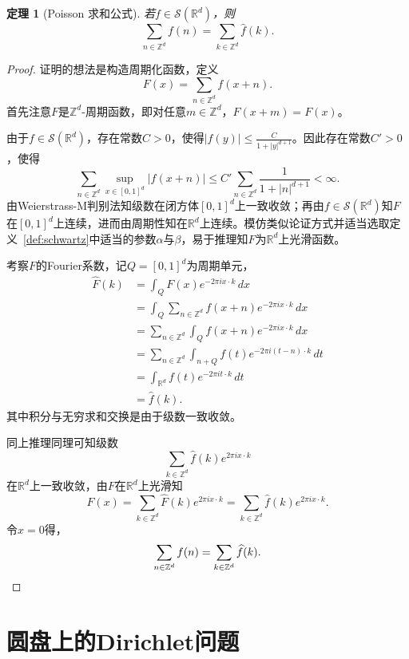 \documentclass[UTF8,zihao=5,linespread=1.34]{ctexart}
\theoremstyle{cnplain}
\newtheorem{theorem}{定理}[section]
\theoremstyle{cnremark}
\begin{document}
\begin{theorem}[Poisson 求和公式]\label{thm:poisson-summation}
若$f \in \mathcal{S}(\mathbb{R}^{d})$，则
\[
\sum_{n \in \mathbb{Z}^{d}} f(n) = \sum_{k \in \mathbb{Z}^{d}} \widehat{f}(k).
\]
\end{theorem}

\begin{proof}
证明的想法是构造周期化函数，定义
\[
F(x) = \sum_{n \in \mathbb{Z}^{d}} f(x+n).
\]
首先注意$F$是$\mathbb{Z}^{d}$-周期函数，即对任意$m \in \mathbb{Z}^{d}$，$F(x+m) = F(x)$。

由于$f \in \mathcal{S}(\mathbb{R}^{d})$，存在常数$C > 0$，使得$|f(y)| \leq \frac{C}{1 + |y|^{d+1}}$。因此存在常数$C' > 0$，使得
\[
\sum_{n \in \mathbb{Z}^{d}} \sup_{x \in [0,1]^{d}} |f(x+n)|
\leq C' \sum_{n \in \mathbb{Z}^{d}} \frac{1}{1 + |n|^{d+1}} < \infty.
\]
由Weierstrass-M判别法知级数在闭方体$[0,1]^d$上一致收敛；再由$f \in \mathcal{S}(\mathbb{R}^{d})$知$F$在$[0,1]^d$上连续，进而由周期性知在$\mathbb{R}^{d}$上连续。模仿类似论证方式并适当选取定义~\ref{def:schwartz}中适当的参数$\alpha$与$\beta$，易于推理知$F$为$\mathbb{R}^{d}$上光滑函数。

考察$F$的Fourier系数，记$Q = [0,1]^{d}$为周期单元，
\begin{align*}
\widehat{F}(k)
&= \int_{Q} F(x) e^{-2\pi i x \cdot k}\,dx \\
&= \int_{Q} \sum_{n \in \mathbb{Z}^{d}} f(x+n) e^{-2\pi i x \cdot k}\,dx \\
&= \sum_{n \in \mathbb{Z}^{d}} \int_{Q} f(x+n) e^{-2\pi i x \cdot k}\,dx \\
&= \sum_{n \in \mathbb{Z}^{d}} \int_{n+Q} f(t) e^{-2\pi i (t-n) \cdot k}\,dt \\
&= \int_{\mathbb{R}^{d}} f(t) e^{-2\pi i t \cdot k}\,dt \\
&= \widehat{f}(k).
\end{align*}
其中积分与无穷求和交换是由于级数一致收敛。

同上推理同理可知级数
\[
\sum_{k \in \mathbb{Z}^{d}} \widehat{f}(k) e^{2\pi i x \cdot k}
\]
在$\mathbb{R}^{d}$上一致收敛，由$F$在$\mathbb{R}^{d}$上光滑知
\[
F(x) = \sum_{k \in \mathbb{Z}^{d}} \widehat{F}(k) e^{2\pi i x \cdot k}
= \sum_{k \in \mathbb{Z}^{d}} \widehat{f}(k) e^{2\pi i x \cdot k}.
\]
令$x = 0$得，
\[
\sum_{n \in \mathbb{Z}^{d}} f(n) = \sum_{k \in \mathbb{Z}^{d}} \widehat{f}(k).\qedhere
\]
\end{proof}

\newpage
\section{圆盘上的Dirichlet问题}
\end{document}
